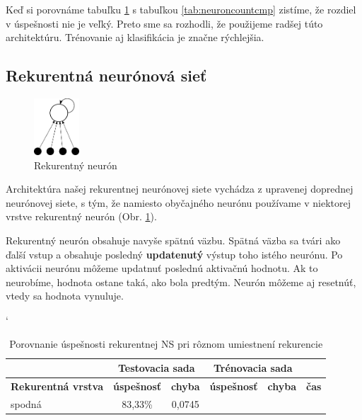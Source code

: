 Keď si porovnáme tabuľku \ref{tab:neuroncountcmp2} s tabuľkou \ref{tab:neuroncountcmp} zistíme, že rozdiel v úspešnosti nie je veľký. Preto sme sa rozhodli, že použijeme radšej túto architektúru. Trénovanie aj klasifikácia je značne rýchlejšia.

\subsection{Rekurentná neurónová sieť}

\begin{figure}[h]
  \begin{center}
    \includegraphics[width=0.15\textwidth]{images/recneuron}
  \end{center}
  \caption{Rekurentný neurón}
  \label{fig:recurentneuron}
\end{figure}

Architektúra našej rekurentnej neurónovej siete vychádza z upravenej doprednej neurónovej siete, s tým, že namiesto obyčajného neurónu používame v niektorej vrstve rekurentný neurón (Obr. \ref{fig:recurentneuron}).

Rekurentný neurón obsahuje navyše spätnú väzbu. Spätná väzba sa tvári ako ďalší vstup a obsahuje posledný \textbf{updatenutý} výstup toho istého neurónu. Po aktivácii neurónu môžeme updatnuť poslednú aktivačnú hodnotu. Ak to neurobíme, hodnota ostane taká, ako bola predtým. Neurón môžeme aj resetnúť, vtedy sa hodnota vynuluje.

\begin{table}[h]
\catcode` %
\centering
\begin{tabular}{|l|c|c|c|c|c|}
\cline{2-5}
\multicolumn{1}{l}{} & \multicolumn{2}{|c|}{\textbf{Testovacia sada}} & \multicolumn{2}{c|}{\textbf{Trénovacia sada}} & \multicolumn{1}{l}{}\\ 
\hline
\textbf{Rekurentná vrstva} & \textbf{úspešnosť} & \textbf{chyba} & \textbf{úspešnosť} & \textbf{chyba} & \textbf{čas} \\ \hline
spodná & 83,33\% & 0,0745 & & &\\ \hline
\end{tabular}
\caption{Porovnanie úspešnosti rekurentnej NS pri rôznom umiestnení rekurencie}
\label{tab:neuroncountcmp2}
\end{table}

